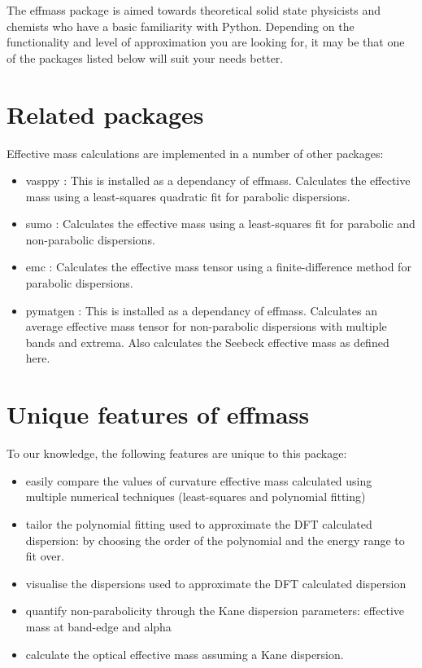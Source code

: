 The effmass package is aimed towards theoretical solid state physicists and chemists who have a basic familiarity with Python. Depending on the functionality and level of approximation you are looking for, it may be that one of the packages listed below will suit your needs better.

\section{Related packages}
\label{sec:related}

Effective mass calculations are implemented in a number of other packages:
\begin{itemize}
    \item vasppy \autocite{Morgan2018}: This is installed as a dependancy of effmass. Calculates the effective mass using a least-squares quadratic fit for parabolic dispersions.
    \item sumo \autocite{Ganose2018}: Calculates the effective mass using a least-squares fit for parabolic and non-parabolic dispersions.
    \item emc \autocite{Fornari2012}: Calculates the effective mass tensor using a finite-difference method for parabolic dispersions.
    \item pymatgen \autocite{Ong2013}: This is installed as a dependancy of effmass. Calculates an average effective mass tensor for non-parabolic dispersions with multiple bands and extrema. Also calculates the Seebeck effective mass as defined here.
\end{itemize}

\section{Unique features of effmass}
\label{sec:unique}

To our knowledge, the following features are unique to this package:
\begin{itemize}
    \item easily compare the values of curvature effective mass calculated using multiple numerical techniques (least-squares and polynomial fitting)
    \item tailor the polynomial fitting used to approximate the DFT calculated dispersion: by choosing the order of the polynomial and the energy range to fit over.
    \item visualise the dispersions used to approximate the DFT calculated dispersion
    \item quantify non-parabolicity through the Kane dispersion parameters: effective mass at band-edge and alpha
    \item calculate the optical effective mass assuming a Kane dispersion.
\end{itemize}

